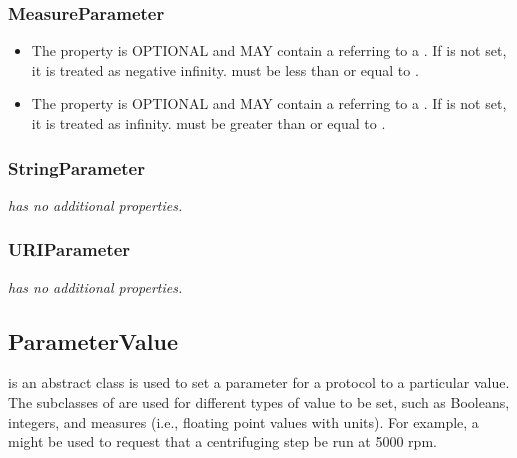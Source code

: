 \subsubsection{MeasureParameter}
\label{sec:MeasureParameter}

\begin{itemize}
\item \label{sec:minMeasure}
The  property is OPTIONAL and MAY contain a  referring to a .
If  is not set, it is treated as negative infinity.
 must be less than or equal to .

\item \label{sec:maxMeasure}
The  property is OPTIONAL and MAY contain a  referring to a .
If  is not set, it is treated as infinity.
 must be greater than or equal to .
\end{itemize}

\subsubsection{StringParameter}
\label{sec:StringParameter}

{\em {} has no additional properties.}

\subsubsection{URIParameter}
\label{sec:URIParameter}

{\em {} has no additional properties.}


\subsection{ParameterValue}
\label{sec:ParameterValue}

 is an abstract class is used to set a parameter for a protocol to a particular value. 
The subclasses of  are used for different types of value to be set, such as Booleans, integers, and measures (i.e., floating point values with units).
For example, a  might be used to request that a centrifuging step be run at 5000 rpm.

